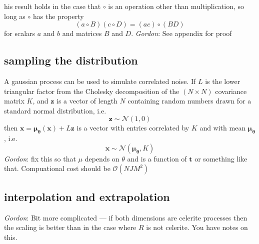 \documentclass[modern]{aastex62}
\newcommand{\todo}[3]{{\color{#2}\emph{#1}: #3}}
\newcommand{\gordontodo}[1]{\todo{Gordon}{red}{#1}}
\newcommand{\bvec}[1]{{\ensuremath{\boldsymbol{#1}}}}
\begin{document}
	his result holds in the case that $\circ$ is an operation other than multiplication, so long as $\circ$ has the property
	\begin{equation}
		(a\circ B)(c\circ D) = (ac)\circ(BD)
	\end{equation}
	for scalars $a$ and $b$ and matrices $B$ and $D$. 
	\gordontodo{See appendix for proof}
	
	\subsection{sampling the distribution}
	A gaussian process can be used to simulate correlated noise. If $L$ is the lower triangular factor from the Cholesky decomposition of the 
	$(N\times N)$ covariance matrix $K$, and $\bvec{z}$ is a vector of length $N$ containing random numbers drawn for a standard normal distribution, i.e.
	\begin{equation}
		\bvec{z} \sim \mathcal{N}(1, 0)
	\end{equation}
	then $\bvec{x} = \bvec{\mu_\bvec{\theta}(\bvec{x})} + L\bvec{z}$ is a vector with entries correlated by $K$ and with mean $\bvec{\mu_\theta}$, i.e.
	\begin{equation}
		\bvec{x} \sim \mathcal{N}(\bvec{\mu_\theta}, K)
	\end{equation}
	\gordontodo{fix this so that $\mu$ depends on $\theta$ and is a function of $\bvec{t}$ or something like that. Compuational cost should be $\mathcal{O}(NJM^2)$}
	
	\subsection{interpolation and extrapolation}	
	\gordontodo{Bit more complicated --- if both dimensions are celerite processes then the scaling is better than in the case where $R$ is not celerite. You have notes on this.}
	
\end{document}
